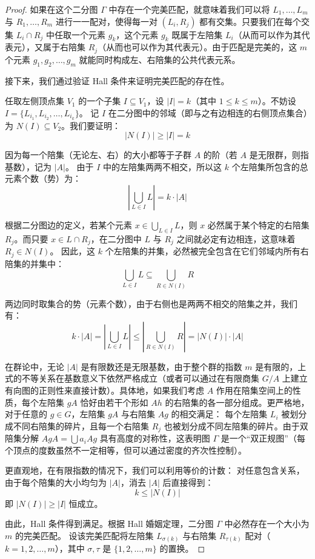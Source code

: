 \documentclass[]{article}
\begin{document}
\begin{proof}
如果在这个二分图 $\Gamma$ 中存在一个完美匹配，就意味着我们可以将 $L_1, \dots, L_m$ 与 $R_1, \dots, R_m$ 进行一一配对，使得每一对 $(L_i, R_j)$ 都有交集。只要我们在每个交集 $L_i \cap R_j$ 中任取一个元素 $g_k$，这个元素 $g_k$ 既属于左陪集 $L_i$（从而可以作为其代表元），又属于右陪集 $R_j$（从而也可以作为其代表元）。由于匹配是完美的，这 $m$ 个元素 $g_1, g_2, \dots, g_m$ 就能同时构成左、右陪集的公共代表元系。

\bigskip
接下来，我们通过验证 Hall 条件来证明完美匹配的存在性。

任取左侧顶点集 $V_1$ 的一个子集 $I \subseteq V_1$，设 $|I| = k$（其中 $1 \le k \le m$）。不妨设 $I = \{L_{i_1}, L_{i_2}, \dots, L_{i_k}\}$。
记 $I$ 在二分图中的邻域（即与之有边相连的右侧顶点集合）为 $N(I) \subseteq V_2$。我们要证明：
\[ |N(I)| \ge |I| = k \]

因为每一个陪集（无论左、右）的大小都等于子群 $A$ 的阶（若 $A$ 是无限群，则指基数），记为 $|A|$。
由于 $I$ 中的左陪集两两不相交，所以这 $k$ 个左陪集所包含的总元素个数（势）为：
\[ \left| \bigcup_{L \in I} L \right| = k \cdot |A| \]

根据二分图边的定义，若某个元素 $x \in \bigcup_{L \in I} L$，则 $x$ 必然属于某个特定的右陪集 $R_j$。而只要 $x \in L \cap R_j$，在二分图中 $L$ 与 $R_j$ 之间就必定有边相连，这意味着 $R_j \in N(I)$。
因此，这 $k$ 个左陪集的并集，必然被完全包含在它们邻域内所有右陪集的并集中：
\[ \bigcup_{L \in I} L \subseteq \bigcup_{R \in N(I)} R \]

两边同时取集合的势（元素个数），由于右侧也是两两不相交的陪集之并，我们有：
\[ k \cdot |A| = \left| \bigcup_{L \in I} L \right| \le \left| \bigcup_{R \in N(I)} R \right| = |N(I)| \cdot |A| \]

在群论中，无论 $|A|$ 是有限数还是无限基数，由于整个群的指数 $m$ 是有限的，上式的不等关系在基数意义下依然严格成立（或者可以通过在有限商集 $G/A$ 上建立有向图的正则性来直接计数）。具体地，如果我们考虑 $A$ 作用在陪集空间上的性质，每个左陪集 $gA$ 恰好由若干个形如 $Ah$ 的右陪集的各一部分组成。更严格地，对于任意的 $g \in G$，左陪集 $gA$ 与右陪集 $Ag$ 的相交满足：
每个左陪集 $L_i$ 被划分成不同右陪集的碎片，且每一个右陪集 $R_j$ 也被划分成不同左陪集的碎片。由于双陪集分解 $AgA = \bigcup a_i Ag$ 具有高度的对称性，这表明图 $\Gamma$ 是一个“双正规图”（每个顶点的度数虽然不一定相等，但可以通过密度的齐次性控制）。

更直观地，在有限指数的情况下，我们可以利用等价的计数：
对任意包含关系，由于每个陪集的大小均匀为 $|A|$，消去 $|A|$ 后直接得到：
\[ k \le |N(I)| \]
即 $|N(I)| \ge |I|$ 恒成立。

\bigskip
由此，Hall 条件得到满足。根据 Hall 婚姻定理，二分图 $\Gamma$ 中必然存在一个大小为 $m$ 的完美匹配。
设该完美匹配将左陪集 $L_{\sigma(k)}$ 与右陪集 $R_{\tau(k)}$ 配对（$k = 1, 2, \dots, m$），其中 $\sigma, \tau$ 是 $\{1, 2, \dots, m\}$ 的置换。


\end{proof}
\end{document}
